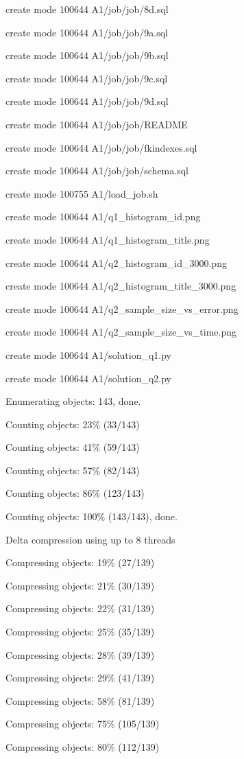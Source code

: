 \documentclass[11pt,a4paper]{article}
\begin{document}
{create mode 100644 A1/job/job/8d.sql

create mode 100644 A1/job/job/9a.sql

create mode 100644 A1/job/job/9b.sql

create mode 100644 A1/job/job/9c.sql

create mode 100644 A1/job/job/9d.sql

create mode 100644 A1/job/job/README

create mode 100644 A1/job/job/fkindexes.sql

create mode 100644 A1/job/job/schema.sql

create mode 100755 A1/load\_job.sh

create mode 100644 A1/q1\_histogram\_id.png

create mode 100644 A1/q1\_histogram\_title.png

create mode 100644 A1/q2\_histogram\_id\_3000.png

create mode 100644 A1/q2\_histogram\_title\_3000.png

create mode 100644 A1/q2\_sample\_size\_vs\_error.png

create mode 100644 A1/q2\_sample\_size\_vs\_time.png

create mode 100644 A1/solution\_q1.py

create mode 100644 A1/solution\_q2.py

Enumerating objects: 143, done.

Counting objects:  23\% (33/143)

Counting objects:  41\% (59/143)

Counting objects:  57\% (82/143)

Counting objects:  86\% (123/143)

Counting objects: 100\% (143/143), done.

Delta compression using up to 8 threads

Compressing objects:  19\% (27/139)

Compressing objects:  21\% (30/139)

Compressing objects:  22\% (31/139)

Compressing objects:  25\% (35/139)

Compressing objects:  28\% (39/139)

Compressing objects:  29\% (41/139)

Compressing objects:  58\% (81/139)

Compressing objects:  75\% (105/139)

Compressing objects:  80\% (112/139)

}
\end{document}
